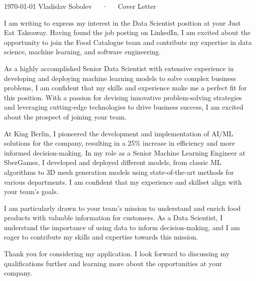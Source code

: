 \documentclass[11pt, a4paper]{awesome-cv}
\begin{document}
\makecvheader[R]

\makecvfooter
  {\today}
  {Vladislav Sobolev~~~·~~~Cover Letter}
  {}

\makelettertitle

\begin{cvletter}


I am writing to express my interest in the Data Scientist position at your Just Eat Takeaway. Having found the job posting on LinkedIn, I am excited about the opportunity to join the Food Catalogue team and contribute my expertise in data science, machine learning, and software engineering.

As a highly accomplished Senior Data Scientist with extensive experience in developing and deploying machine learning models to solve complex business problems, I am confident that my skills and experience make me a perfect fit for this position. With a passion for devising innovative problem-solving strategies and leveraging cutting-edge technologies to drive business success, I am excited about the prospect of joining your team.

At King Berlin, I pioneered the development and implementation of AI/ML solutions for the company, resulting in a 25\% increase in efficiency and more informed decision-making. In my role as a Senior Machine Learning Engineer at SberGames, I developed and deployed different models, from classic ML algorithms to 3D mesh generation models using state-of-the-art methods for various departments. I am confident that my experience and skillset align with your team's goals.

I am particularly drawn to your team's mission to understand and enrich food products with valuable information for customers. As a Data Scientist, I understand the importance of using data to inform decision-making, and I am eager to contribute my skills and expertise towards this mission.

Thank you for considering my application. I look forward to discussing my qualifications further and learning more about the opportunities at your company.


\end{cvletter}
\end{document}
